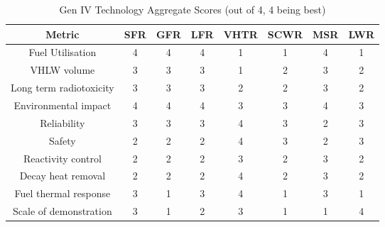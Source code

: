 \documentclass[journal]{IEEEtran}
\begin{document}
\begin{table}[!tb]
\renewcommand{\arraystretch}{1}
\caption{Gen IV Technology Aggregate Scores \cite{nnl} (out of 4, 4 being best)}
\label{table:metrics}
\centering
\begin{adjustbox}{width=0.47\textwidth,keepaspectratio}
\begin{tabular}{|c|c|c|c|c|c|c|c|}
\hline
\textbf{Metric} & \textbf{SFR} & \textbf{GFR} & \textbf{LFR} & \textbf{VHTR} & \textbf{SCWR} & \textbf{MSR} & \textbf{LWR}\\
\hline
Fuel Utilisation 			& 4 & 4 & 4 & 1 & 1 & 4 & 1 \\ \hline
VHLW volume			& 3 & 3 & 3 & 1 & 2 & 3 & 2\\ \hline
Long term radiotoxicity 		& 3 & 3 & 3 & 2 & 2 & 3 & 2\\ \hline
Environmental impact 		& 4 & 4 & 4 & 3 & 3 & 4 & 3\\ \hline
Reliability				& 3 & 3 & 3 & 4 & 3 & 2 & 3\\ \hline
Safety				& 2 & 2 & 2 & 4 & 3 & 2 & 3\\ \hline
Reactivity control			& 2 & 2 & 2 & 3 & 2 & 3 & 2\\ \hline
Decay heat removal		& 2 & 2 & 2 & 4 & 2 & 3 & 2\\ \hline
Fuel thermal response		& 3 & 1 & 3 & 4 & 1 & 3 & 1\\ \hline
Scale of demonstration		& 3 & 1 & 2 & 3 & 1 & 1 & 4\\ \hline

\end{tabular}
\end{adjustbox}
\end{table}
\end{document}

